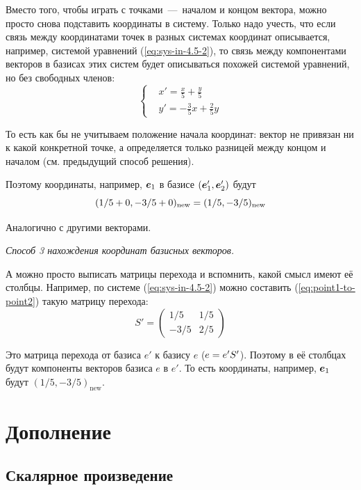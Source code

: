 \documentclass[a4paper,12pt]{article}
\begin{document}
\begin{solution}
    Вместо того, чтобы играть с точками~---~началом и концом вектора, можно просто снова подставить координаты в систему.
    Только надо учесть, что если связь между координатами точек в разных системах координат описывается, например, системой уравнений (\ref{eq:sys-in-4.5-2}), то связь между компонентами векторов в базисах этих систем будет описываться похожей системой уравнений, но без свободных членов:
    \[
      \left\{
        \begin{aligned}
          &x' = \frac{x}{5} + \frac{y}{5}\\
          &y' = -\frac{3}{5}x + \frac{2}{5}y
        \end{aligned}
      \right.
    \]
    
    То есть как бы не учитываем положение начала координат: вектор не привязан ни к какой конкретной точке, а определяется только разницей между концом и началом (см. предыдущий способ решения).
    
    Поэтому координаты, например, $\boldsymbol e_1$ в базисе $(\boldsymbol e_1', \boldsymbol e_2')$ будут
    \[
      (1/5 \hm+ 0, -3/5 \hm+ 0)_{\mathrm{new}} \hm= (1/5, -3/5)_{\mathrm{new}}
    \]

    Аналогично с другими векторами.
    
    \medskip
    
    \emph{Способ 3 нахождения координат базисных векторов.}
    
    А можно просто выписать матрицы перехода и вспомнить, какой смысл имеют её столбцы.
    Например, по системе (\ref{eq:sys-in-4.5-2}) можно составить (\ref{eq:point1-to-point2}) такую матрицу перехода:
    \[
      S' = \begin{pmatrix}
        1/5 & 1/5\\
        -3/5 & 2/5
      \end{pmatrix}
    \]
    
    Это матрица перехода от базиса $e'$ к базису $e$ ($e \hm= e' S'$).
    Поэтому в её столбцах будут компоненты векторов базиса $e$ в $e'$.
    То есть координаты, например, $\boldsymbol e_1$ будут $(1/5, -3/5)_{\mathrm{new}}$.
  \end{solution}


  \newpage
  
  \section{Дополнение}
  
  \subsection{Скалярное произведение}
  
\end{document}
